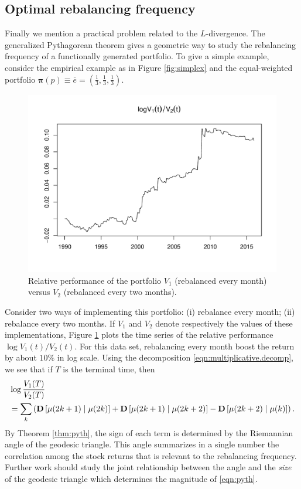 \documentclass[graybox]{svmult}
\begin{document}
\subsection{Optimal rebalancing frequency}
Finally we mention a practical problem related to the $L$-divergence. The generalized Pythagorean theorem gives a geometric way to study the rebalancing frequency of a functionally generated portfolio. To give a simple example, consider the empirical example as in Figure \ref{fig:simplex} and the equal-weighted portfolio $\boldsymbol{\pi}(p) \equiv \overline{e} = \left(\frac{1}{3}, \frac{1}{3}, \frac{1}{3}\right)$.

\begin{figure}[t!]
\centering
\includegraphics[scale=0.42]{example1.pdf}
\caption{Relative performance of the portfolio $V_1$ (rebalanced every month) versus $V_2$ (rebalanced every two months).} \label{fig:example1}
\end{figure}

Consider two ways of implementing this portfolio: (i) rebalance every month; (ii) rebalance every two months. If $V_1$ and $V_2$ denote respectively the values of these implementations, Figure \ref{fig:example1} plots the time series of the relative performance $\log V_1(t) / V_2(t)$. For this data set, rebalancing every month boost the return by about $10\%$ in log scale. Using the decomposition \eqref{eqn:multiplicative.decomp}, we see that if $T$ is the terminal time, then
\begin{equation*}
\begin{split}
& \log \frac{V_1(T)}{V_2(T)}\\
&= \sum_k \left({\bf D}\left[\mu(2k + 1) \mid \mu(2k) \right] + {\bf D}\left[\mu(2k + 1) \mid \mu(2k + 2)\right] - {\bf D}\left[\mu(2k + 2) \mid \mu(k)\right]  \right).
\end{split}
\end{equation*}
By Theorem \ref{thm:pyth}, the sign of each term is determined by the Riemannian angle of the geodesic triangle. This angle summarizes in a single number the correlation among the stock returns that is relevant to the rebalancing frequency. Further work should study the joint relationship between the angle and the {\it size} of the geodesic triangle which determines the magnitude of \eqref{eqn:pyth}.
\end{document}
